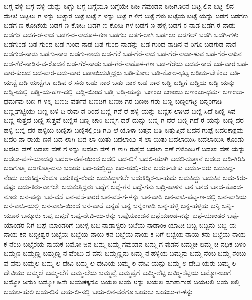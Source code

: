 ಬಗ್ಗ-ವಳ್ಳಿ
ಬಗ್ಗ-ವಳ್ಳಿ-ಯನ್ನು
ಬಗ್ಗು
ಬಗ್ಗೆ
ಬಗ್ಗೆಯೂ
ಬಗ್ಗೆಯೇ
ಬಚಿ-ಗವುಂಡನ
ಬಜಗೂರಿನ
ಬಟ್ಟ-ಲಿನ
ಬಟ್ಟ-ಲಿನ-ಮೇಲೆ
ಬಟ್ಟಲು-ಗ-ಳನ್ನು
ಬಟ್ಟಾರ
ಬಟ್ಟೆ
ಬಟ್ಟೆ-ಗ-ಳನ್ನು
ಬಟ್ಟೆ-ಗ-ಳಿಗೆ
ಬಟ್ಟೆ-ಗಳು
ಬಟ್ಟೆಯ
ಬಟ್ಟೆ-ಯನ್ನು
ಬಡಗ
ಬಡಗಣ
ಬಡಗ-ಣ-ಕೋಟೆಯ
ಬಡಗ-ಣ-ಕೋಡಿ
ಬಡಗ-ಣ-ಕೋಡಿ-ಗಳ
ಬಡಗ-ಣ-ಹಳ್ಳ
ಬಡಗ-ರ-ನಾಡ
ಬಡಗ-ರ-ನಾಡು
ಬಡಗರೆ
ಬಡಗ-ರೆ-ನಾಡ
ಬಡಗ-ರೆ-ನಾಡೊಳ-ಗಣ
ಬಡಗಲ
ಬಡಗ-ಲಾಗಿ
ಬಡಗಲು
ಬಡಗಲ್
ಬಡಗಿ
ಬಡಗಿ-ಗಳು
ಬಡಗುಂಡ
ಬಡ-ಗುಂದ
ಬಡ-ಗುಂದ-ನಾಡ
ಬಡ-ಗುಂದ-ನಾಡನ್ನು
ಬಡ-ಗುಂದ-ನಾಡಿನ-ವ-ರಿಗೂ
ಬಡಗುಡ-ನಾಡ
ಬಡಗುಡ-ನಾಡು
ಬಡಗು-ನಾಡ
ಬಡಗು-ನಾಡು
ಬಡ-ಗೆರೆ
ಬಡ-ಗೆರೆ-ನಾಡ
ಬಡ-ಗೆರೆ-ನಾಡಾ-ಳುವ
ಬಡ-ಗೆರೆ-ನಾಡಿನ
ಬಡ-ಗೆರೆ-ನಾಡಿನ-ವ-ರೊಡನೆ
ಬಡ-ಗೆರೆ-ನಾಡು
ಬಡ-ಗೆರೆ-ನಾಡೊಳ-ಗಣ
ಬಡ-ಗೆರೆಯ
ಬಡವ-ನಾದೆ
ಬಡ-ವಾರ
ಬಡ-ವಾರ-ಕುಲದ
ಬಡ-ವಾರ-ಬಡು-ವಾರ
ಬಡಾಯಿಸುತ್ತಿದ್ದರು
ಬಡಿ-ಕೋಲ
ಬಡಿ-ಕೋಲ-ಭಟ್ಟ
ಬಡಿಯ-ಬೇಕೆಂಬ
ಬಡಿ-ಯಬ್ಬೆ
ಬಡಿ-ಯಬ್ಬೆಗೂ
ಬಡಿವ-ರ-ಸನು
ಬಡು-ವಾರ
ಬಡು-ವಾರ-ಬಡ-ವಾರ
ಬಡ್ಡಿ
ಬಡ್ಡಿಗೆ
ಬಡ್ಡಿಯ
ಬಡ್ಡಿ-ಯನ್ನು
ಬಡ್ಡಿ-ಯಲ್ಲಿ
ಬಡ್ಡಿ-ಯ-ಹಣ-ದಲ್ಲಿ
ಬಡ್ಡಿ-ಯಿಂದ
ಬಡ್ತಿ
ಬಡ್ತಿ-ಯನ್ನು
ಬಣಂಜ
ಬಣಂಜು
ಬಣಂಜು-ಧರ್ಮ
ಬಣಂಜು-ಧರ್ಮವು
ಬಣ-ಗ-ಳಲ್ಲಿ
ಬಣಜ-ವರ್ತನೆ
ಬಣಜಿಗ
ಬಣಜಿ-ಗರ
ಬಣಜಿ-ಗರು
ಬಣ್ಣ
ಬಣ್ಣಂಗಟ್ಟಿ-ಬನ್ನಂಗಾಡಿ
ಬಣ್ಣಂಗಟ್ಟಿಯು
ಬಣ್ಣ-ಬಳಿ-ದಿ-ರುವು-ದ-ರಿಂದ
ಬಣ್ಣಿ-ಗದೆ-ರೆ-ಹಳ್ಳಿ-ಯನ್ನು
ಬಣ್ಣಿಸ-ಲಾಗಿದೆ
ಬಣ್ಣಿ-ಸಿದೆ
ಬಣ್ಣಿ-ಸಿವೆ
ಬಣ್ಣಿ-ಸುತ್ತದೆ
ಬಣ್ಣಿ-ಸುತ್ತವೆ
ಬಣ್ಣಿಸೆ
ಬಣ್ನ-ಚಾರಿ
ಬಣ್ನಿಗ-ದರೆ-ಯನ್ನು
ಬಣ್ನಿ-ಗ-ದೆರೆ
ಬಣ್ನಿ-ಗದೆ-ರೆ-ಯನ್ನು
ಬಣ್ನಿ-ದರ-ಹಳ್ಳಿ
ಬಣ್ನಿ-ದರ-ಹಳ್ಳಿಯ
ಬಣ್ನಿಪು
ಬಣ್ನಿಸಲ್ಬಿಂಡಿ-ಗವಿ-ಲೆ-ಯೊಳಾ
ಬತ್ತದ
ಬತ್ತಿ
ಬತ್ತುತ್ತಿದೆ
ಬದನ-ಗುಪ್ಪೆ
ಬದರಿಕಾಶ್ರಮ
ಬದರಿ-ನಾ-ರಾಯ-ಣನ
ಬದ-ಲಾಗಿ
ಬದ-ಲಾ-ಯಿತು
ಬದಲಾಯಿ-ಸ-ಲಾ-ಯಿತು
ಬದಲಾಯಿಸಿ
ಬದಲಾಯಿಸಿ-ಕೊಂಡು
ಬದಲಾ-ವಣೆ
ಬದಲಾ-ವಣೆ-ಗ-ಳನ್ನು
ಬದಲಾ-ವಣೆ-ಗ-ಳಾಗಿ-ರುತ್ತವೆ
ಬದಲಾ-ವಣೆ-ಗಳೊಂದಿಗೆ
ಬದಲಾ-ವಣೆ-ಯನ್ನು
ಬದಲಾ-ವಣೆ-ಯಾದವು
ಬದಲಾ-ವಣೆ-ಯಿಂದ
ಬದಲಿ
ಬದ-ಲಿಗೆ
ಬದಲಿ-ಯಾಗಿ
ಬದಲಿ-ಸುತ್ತಾನೆ
ಬದಲು
ಬದಿ-ಗಿರಿಸಿ
ಬದಿಗೊತ್ತಿ
ಬದಿಗೊತ್ತಿ-ದನು
ಬದಿಯ
ಬದಿ-ಯಲ್ಲಿದ್ದು
ಬದಿ-ಯಲ್ಲಿ-ರುವ
ಬದುಕ-ಬೇಕು
ಬದುಕಿ-ದರು
ಬದುಕಿದ್ದ-ನೆಂದು
ಬದುಕಿದ್ದ-ನೆಂದೂ
ಬದುಕಿದ್ದ-ರೆಂದು
ಬದುಕಿದ್ದಾಗಲೇ
ಬದುಕಿದ್ದಿರ-ಬ-ಹುದು
ಬದುಕಿದ್ದು
ಬದುಕಿನ
ಬದು-ಕಿರು-ವಷ್ಟು
ಬದು-ಕಿರು-ವಾಗಲೇ
ಬದುಕುತ್ತಿದ್ದರು
ಬದ್ದೆಗ
ಬದ್ದೆ-ಗನ
ಬದ್ದೆ-ಗನು
ಬದ್ರಿ-ಹಾಳಿನ
ಬನ
ಬನದ
ಬನದ-ತೊಂಡ-ನೂರು
ಬನ-ವನ್ನು
ಬನ-ವಸೆ
ಬನ-ವಸೆ-ಕಾರರ
ಬನ-ವಸೆ-ಗ-ಳನ್ನು
ಬನ-ವಾಸಿ
ಬನ-ವಾಸಿ-ಪಟ್ಟ-ಣ-ದಲ್ಲಿ
ಬನ-ವಾಸಿಯ
ಬನ-ವಾಸಿ-ಯಲ್ಲಿ
ಬನ-ವಾಸಿ-ಯಿಂದ
ಬನ-ವಾಸೆ
ಬನ್ದಡೆ
ಬನ್ನ
ಬನ್ನಂಗಾಡಿ
ಬನ್ನ-ಹಳ್ಳಿ
ಬನ್ನ-ಹಳ್ಳಿಯ
ಬನ್ನಿ
ಬನ್ನಿ-ಯೂರ
ಬನ್ನೂರು
ಬಪ್ಪ
ಬಪ್ಪಡೆ
ಬಪ್ಪ-ದೇವಿ-ಯ-ರನ್ನು
ಬಪ್ಪೆಯಾಂಡನ
ಬಪ್ಪೆಯಾಂಡ-ನನ್ನು
ಬಪ್ಪೆ-ಯಾಂಡರ
ಬಪ್ಪೆ-ಯಾಂಡರ-ನಿಗೆ
ಬಪ್ಪೆ-ಯಾಂಡರಿಗೆ
ಬಬಳ್ಳ
ಬಬಿ-ನಾಡಾಳ್ವರು
ಬಬೆಯ-ನಾಡಾಂಕಿ-ಯಾದೀ
ಬಬ್ಬ
ಬಬ್ಬನು
ಬಬ್ಬ-ಯ-ನಾಯ-ಕನ
ಬಬ್ಬೀಶ್ವರ
ಬಬ್ಬೆಯ
ಬಬ್ಬೆಯ-ನಾಯ-ಕನ
ಬಬ್ಬೆಯ-ನಾಯ-ಕ-ನಿಗೆ
ಬಬ್ಬೆಯ-ನಾಯ-ಕನು
ಬಬ್ಬೆಯ-ನಾಯ-ಕ-ನೆಂಬ
ಬಭೈರಯ-ನಾಯಕ
ಬಮೋ-ಜನ
ಬಮ್ಮ
ಬಮ್ಮ-ಗವುಂಡನ
ಬಮ್ಮ-ಗ-ವುಡನ
ಬಮ್ಮಚ
ಬಮ್ಮ-ಚ-ನಧಿಕ-ಬಳಂ
ಬಮ್ಮಣ
ಬಮ್ಮಣ್ಣ
ಬಮ್ಮಣ್ಣ-ನ-ವೆಂಬು-ವ-ವನು
ಬಮ್ಮಣ್ಣನು
ಬಮ್ಮ-ನ-ಹಳ್ಳಿಯ
ಬಮ್ಮನು
ಬಮ್ಮ-ನೆಂಬ
ಬಮ್ಮ-ನೆಂಬು-ವ-ವನು
ಬಮ್ಮಲ
ಬಮ್ಮ-ಲ-ದೇವಿ
ಬಮ್ಮ-ಲ-ದೇವಿಯ
ಬಮ್ಮ-ಲ-ದೇವಿ-ಯನ್ನು
ಬಮ್ಮ-ಲ-ದೇವಿ-ಯರು
ಬಮ್ಮ-ಲ-ದೇವಿಯು
ಬಮ್ಮಲೆ
ಬಮ್ಮ-ಲೆಗೆ
ಬಮ್ಮ-ಲೆಯ
ಬಮ್ಮವ್ವೆ
ಬಮ್ಮವ್ವೆಗೆ
ಬಮ್ಮಿ-ಶೆಟ್ಟಿ
ಬಮ್ಮಿ-ಸೆಟ್ಟಿಯ
ಬಮ್ಮೋ-ಜಂಗೆ
ಬಮ್ಮೋ-ಜನುಂ
ಬಮ್ಮೋ-ಜನೇ
ಬಯಚಕ್ಕನೂ
ಬಯಲ
ಬಯ-ಲನ್ನು
ಬಯಲ-ಮಾರ್ತಾಂಡ
ಬಯಲಲಿ
ಬಯ-ಲಲ್ಲಿ
ಬಯಲ-ಹುಲಿ
ಬಯ-ಲಿನ
ಬಯ-ಲಿ-ನಲ್ಲಿ
ಬಯ-ಲಿನ-ವರೆಗೂ
ಬಯಲು
ಬಯಲು-ಗ-ಳನ್ನು
